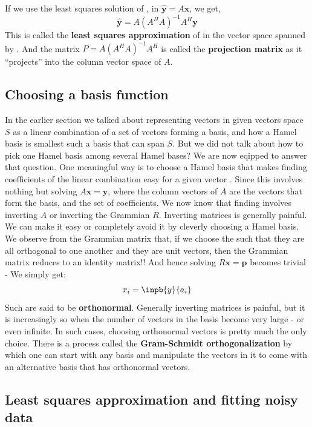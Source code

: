  If we use the least squares solution of , in \( \hat{\mathbf{y}} = A\mathbf{x} \), we get,
 	\[ \hat{\mathbf{y}} = A(A^H A)^{-1} A^H \mathbf{y} \]
This is called the \textbf{least squares approximation} of  in the vector space spanned by . And the matrix \( P = A(A^H A)^{-1} A^H \) is called the \textbf{projection matrix} as it ``projects''  into the column vector space of \(A\). 

\subsection{Choosing a basis function}
In the earlier section we talked about representing vectors in given vectors space \(S\) as a linear combination of a set of vectors forming a basis, and how a Hamel basis is smallest such a basis that can span \(S\). But we did not talk about how to pick one Hamel basis among several Hamel bases? We are now eqipped to answer that question. One meaningful way is to choose a Hamel basis that makes finding coefficients of the linear combination easy for a given vector . Since this involves nothing but solving \(A\mathbf{x} = \mathbf{y}\), where the column vectors  of \(A\) are the vectors that form the basis, and  the set of coefficients. We now know that finding  involves inverting \(A\) or inverting the Grammian \(R\). Inverting matrices is generally painful. We can make it easy or completely avoid it by cleverly choosing a Hamel basis. We observe from the Grammian matrix that, if we choose the  such that they are all orthogonal to one another and they are unit vectors, then the Grammian matrix reduces to an identity matrix!! And hence solving \(R\mathbf{x} = \mathbf{p}\) becomes trivial - We simply get:
	\[ x_i = \inpb{y}{a_i} \]
Such  are said to be \textbf{orthonormal}. Generally inverting matrices is painful, but it is increasingly so when the number of vectors in the basis become very large - or even infinite. In such cases, choosing orthonormal vectors is pretty much the only choice. There is a process called the \textbf{Gram-Schmidt orthogonalization} by which one can start with any basis and manipulate the vectors in it to come with an alternative basis that has orthonormal vectors. 

\subsection{Least squares approximation and fitting noisy data}






